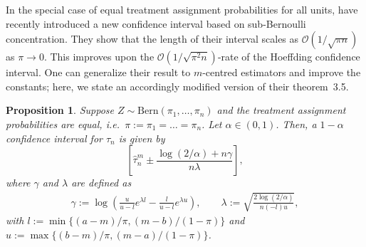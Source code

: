\documentclass[aos]{imsart2}
\theoremstyle{plain}
\newtheorem{proposition}[theorem]{Proposition}
\theoremstyle{definition}
\newcommand{\tauh}{\hat{\tau}}
\newcommand{\bern}{\mathrm{Bern}}
\begin{document}
In the special case of equal treatment assignment probabilities for all units,
\citet{sandoval_nonasymptotic_2026} have recently introduced a new confidence interval based on sub-Bernoulli concentration. They show that the length of their interval scales as $\mathcal{O}(1/\sqrt{\pi n})$ as $\pi \to 0$. This improves upon the $\mathcal{O}(1/\sqrt{\pi^2 n})$-rate of the Hoeffding confidence interval. One can generalize their result to $m$-centred estimators and improve the constants; here, we state an accordingly modified version of their theorem~3.5.

\begin{proposition}\label{prop:bern-sandoval}
    Suppose $Z\sim \bern(\pi_1,\ldots,\pi_n)$ and the treatment assignment probabilities are equal, i.e.\ $\pi:=\pi_1=\ldots=\pi_n$. Let $\alpha \in (0,1)$. Then, a $1-\alpha$ confidence interval for $\tau_n$ is given by
    \begin{equation*}
        \left[\tauh_n^m \pm  \frac{\log(2/\alpha)+n\gamma}{n\lambda}\right],
    \end{equation*}
    where $\gamma$ and $\lambda$ are defined as
    \begin{gather*}
        \gamma := \log\left(\frac{u}{u-l}e^{\lambda l} - \frac{l}{u-l}e^{\lambda u}\right),\qquad
        \lambda := \sqrt{\frac{2\log(2/\alpha)}{n(-l)u}},
    \end{gather*}
    with $l:=\min\{(a-m)/\pi, (m-b)/(1-\pi)\}$ and $u:= \max\{(b-m)/\pi,(m-a)/(1-\pi)\}$.
    
\end{proposition}
\end{document}
